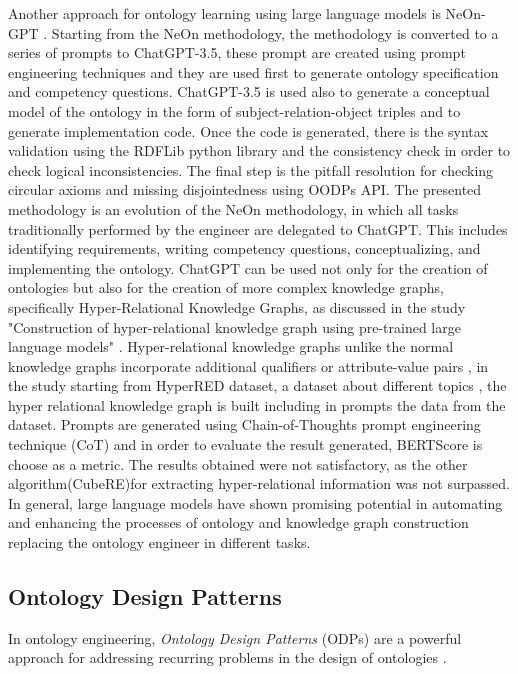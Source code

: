 Another approach for ontology learning using large language models is NeOn-GPT \cite{fathallah2024neon}. Starting from the NeOn methodology, the methodology is converted to a series of prompts to ChatGPT-3.5, these prompt are created using prompt engineering techniques and they are used first to generate ontology specification and competency questions. ChatGPT-3.5 is used also to generate a conceptual model of the ontology in the form of subject-relation-object triples and to generate implementation code. Once the code is generated, there is the syntax validation using the RDFLib python library \cite{rdflib} and the consistency check in order to check logical inconsistencies. The final step is the pitfall resolution for checking circular axioms and missing disjointedness using OODPs API. The presented methodology is an evolution of the NeOn methodology, in which all tasks traditionally performed by the engineer are delegated to ChatGPT. This includes identifying requirements, writing competency questions, conceptualizing, and implementing the ontology.%
ChatGPT can be used not only for the creation of ontologies but also for the creation of more complex knowledge graphs, specifically Hyper-Relational Knowledge Graphs, as discussed in the study "Construction of hyper-relational knowledge graph using pre-trained large language models" \cite{datta2024construction}. Hyper-relational knowledge graphs unlike the normal knowledge graphs incorporate additional qualifiers or attribute-value pairs \cite{hyper}, in the study starting from HyperRED dataset, a dataset about different topics , the hyper relational knowledge graph is built including in prompts the data from the dataset. Prompts are generated using Chain-of-Thoughts prompt engineering technique (CoT) and in order to evaluate the result generated, BERTScore is choose as a metric. The results obtained were not satisfactory, as the other algorithm(CubeRE)for extracting hyper-relational information was not surpassed.
In general, large language models have shown promising potential  in automating and enhancing the processes of ontology and knowledge graph construction replacing the ontology engineer in different tasks.

\newpage
\subsection{Ontology Design Patterns}
\label{subsection:2_2_ontology_design_patterns}
In ontology engineering, \textit{Ontology Design Patterns} (ODPs) \cite{odps} are a powerful approach for addressing recurring problems in the design of ontologies \cite{hitzler2016ontology}.

